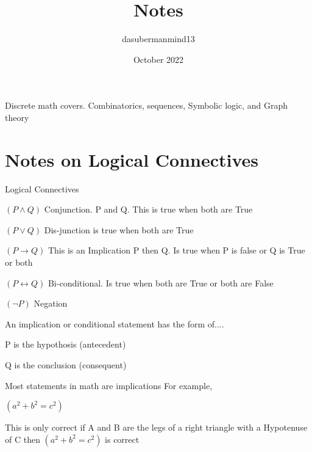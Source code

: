\documentclass{article}
\title{Notes}
\author{dasubermanmind13 }
\date{October 2022}
\begin{document}
\maketitle

Discrete math covers. Combinatorics, sequences, Symbolic logic, and Graph theory
\section{Notes on Logical Connectives}

Logical Connectives

$(P \wedge Q)$ Conjunction. P and Q. This is true when both are True

$(P \lor Q)$ Dis-junction is true when both are True

$(P \rightarrow Q)$ This is an Implication P then Q. Is true when P is false or Q is True or both

$(P \leftrightarrow Q)$ Bi-conditional. Is true when both are True or both are False

$(\neg P)$ Negation

An implication or conditional  statement has the form of....

P is the hypothosis (antecedent) 

Q is the conclusion (consequent)

Most statements in math are implications
For example,

$(a^2 + b^2 = c^2)$

This is only correct if A and B are the legs of a right triangle with a Hypotenuse of C then 
$(a^2 + b^2 = c^2)$ is correct
\end{document}
